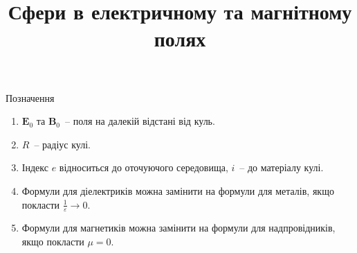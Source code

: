 \documentclass[12pt, oneside]{extarticle}
\title{\large\bfseries Сфери в електричному та магнітному полях}
\date{}
\newcommand{\vect}[1]{\symbf{#1}}
\newcommand{\vect}[1]{\mathbf{#1}}
\def\Efield{\vect{E}}
\def\Bfield{\vect{B}}
\let\epsilon\varepsilon}
\begin{document}
\maketitle\thispagestyle{empty}

\begin{center}
	Позначення
\end{center}
\begin{enumerate}
	\item $\Efield_0$ та $\Bfield_0$~-- поля на далекій відстані від куль.
	\item $R$~-- радіус кулі.
	\item Індекс $e$ відноситься до оточуючого середовища, $i$~-- до матеріалу кулі.
	\item Формули для діелектриків можна замінити на формули для металів, якщо покласти $\frac{1}{\epsilon} \to 0$.
	\item Формули для магнетиків можна замінити на формули для надпровідників, якщо покласти $\mu = 0$.
\end{enumerate}

\newpage
\renewcommand{\arraystretch}{1.5}%
\end{document}
